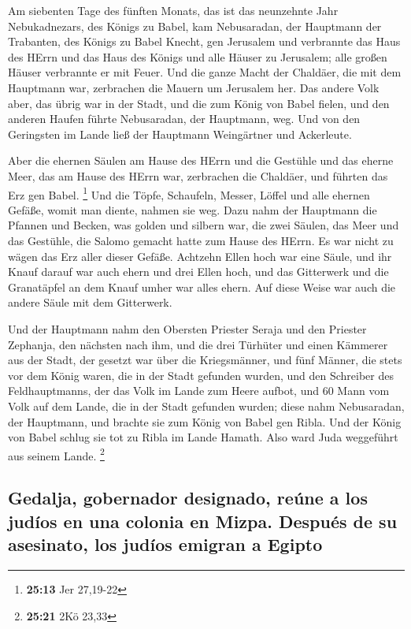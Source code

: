  Am siebenten Tage des fünften Monats, das ist das
neunzehnte Jahr Nebukadnezars, des Königs zu Babel, kam Nebusaradan, der
Hauptmann der Trabanten, des Königs zu Babel Knecht, gen Jerusalem
 und verbrannte das Haus des HErrn und das Haus des Königs
und alle Häuser zu Jerusalem; alle großen Häuser verbrannte er mit
Feuer.  Und die ganze Macht der Chaldäer, die mit dem
Hauptmann war, zerbrachen die Mauern um Jerusalem her. 
Das andere Volk aber, das übrig war in der Stadt, und die zum König von
Babel fielen, und den anderen Haufen führte Nebusaradan, der Hauptmann,
weg.  Und von den Geringsten im Lande ließ der Hauptmann
Weingärtner und Ackerleute.

 Aber die ehernen Säulen am Hause des HErrn und die
Gestühle und das eherne Meer, das am Hause des HErrn war, zerbrachen die
Chaldäer, und führten das Erz gen Babel. \footnote{\textbf{25:13} Jer
  27,19-22}  Und die Töpfe, Schaufeln, Messer, Löffel und
alle ehernen Gefäße, womit man diente, nahmen sie weg. 
Dazu nahm der Hauptmann die Pfannen und Becken, was golden und silbern
war,  die zwei Säulen, das Meer und das Gestühle, die
Salomo gemacht hatte zum Hause des HErrn. Es war nicht zu wägen das Erz
aller dieser Gefäße.  Achtzehn Ellen hoch war eine Säule,
und ihr Knauf darauf war auch ehern und drei Ellen hoch, und das
Gitterwerk und die Granatäpfel an dem Knauf umher war alles ehern. Auf
diese Weise war auch die andere Säule mit dem Gitterwerk.

 Und der Hauptmann nahm den Obersten Priester Seraja und
den Priester Zephanja, den nächsten nach ihm, und die drei Türhüter
 und einen Kämmerer aus der Stadt, der gesetzt war über
die Kriegsmänner, und fünf Männer, die stets vor dem König waren, die in
der Stadt gefunden wurden, und den Schreiber des Feldhauptmanns, der das
Volk im Lande zum Heere aufbot, und 60 Mann vom Volk auf dem Lande, die
in der Stadt gefunden wurden;  diese nahm Nebusaradan,
der Hauptmann, und brachte sie zum König von Babel gen Ribla.
 Und der König von Babel schlug sie tot zu Ribla im Lande
Hamath. Also ward Juda weggeführt aus seinem Lande. \footnote{\textbf{25:21}
  2Kö 23,33}

\hypertarget{gedalja-gobernador-designado-reuxfane-a-los-juduxedos-en-una-colonia-en-mizpa.-despuuxe9s-de-su-asesinato-los-juduxedos-emigran-a-egipto}{%
\subsection{Gedalja, gobernador designado, reúne a los judíos en una
colonia en Mizpa. Después de su asesinato, los judíos emigran a
Egipto}\label{gedalja-gobernador-designado-reuxfane-a-los-juduxedos-en-una-colonia-en-mizpa.-despuuxe9s-de-su-asesinato-los-juduxedos-emigran-a-egipto}}

